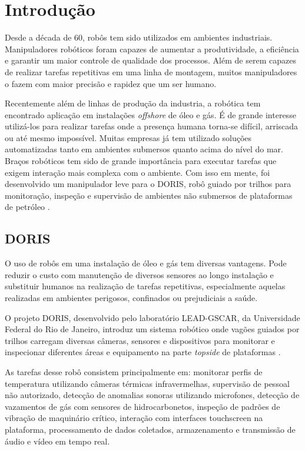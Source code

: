 	\chapter{Introdução}

Desde a década de 60, robôs tem sido utilizados em ambientes industriais. Manipuladores robóticos foram capazes de aumentar a produtividade, a eficiência e garantir um maior controle de qualidade dos processos. Além de serem capazes de realizar tarefas repetitivas em uma linha de montagem, muitos manipuladores o fazem com maior precisão e rapidez que um ser humano. 

Recentemente além de linhas de produção da industria, a robótica tem encontrado aplicação em instalações \textit{offshore} de óleo e gás. É de grande interesse utilizá-los para realizar tarefas onde a presença humana torna-se difícil, arriscada ou até mesmo impossível. Muitas empresas já tem utilizado soluções automatizadas tanto em ambientes submersos quanto acima do nível do mar. Braços robóticos tem sido de grande importância para executar tarefas que exigem interação mais complexa com o ambiente. Com isso em mente, foi desenvolvido um manipulador leve para o DORIS, robô guiado por trilhos para monitoração, inspeção e supervisão de ambientes não submersos de plataformas de petróleo \citep{xaud2016doris}.

\section{DORIS}
O uso de robôs em uma instalação de óleo e gás tem diversas vantagens. Pode reduzir o custo com manutenção de diversos sensores ao longo instalação e substituir humanos na realização de tarefas repetitivas, especialmente aquelas realizadas em ambientes perigosos, confinados ou prejudiciais a saúde. 

O projeto DORIS, desenvolvido pelo laboratório LEAD-GSCAR, da Universidade Federal do Rio de Janeiro, introduz um sistema robótico onde vagões guiados por trilhos carregam diversas câmeras, sensores e dispositivos para monitorar e inspecionar diferentes áreas e equipamento na parte \textit{topside} de plataformas \citep{nunes2013doris, galassi2014doris, freitas2015embedded}.

As tarefas desse robô consistem principalmente em: monitorar perfis de temperatura utilizando câmeras térmicas infravermelhas, supervisão de pessoal não autorizado, detecção de anomalias sonoras utilizando microfones, detecção de vazamentos de gás com sensores de hidrocarbonetos, inspeção de padrões de vibração de maquinário crítico, interação com interfaces touchscreen na plataforma, processamento de dados coletados, armazenamento e transmissão de áudio e vídeo em tempo real.


